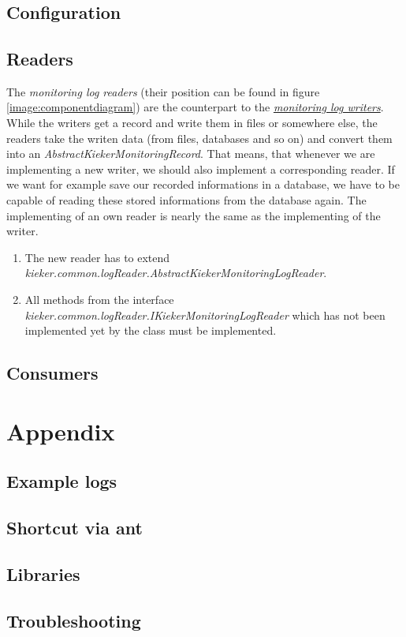 \documentclass[a4paper, oneside, 11pt]{scrartcl}
\begin{document}
\section{\KiekerAnalysis}
\subsection{Configuration}
\subsection{Readers}
The \textit{monitoring log readers} (their position can be found in figure \ref{image:componentdiagram}) are the counterpart to the \hyperlink{monitoringlogwriters}{\textit{monitoring log writers}}. While the writers get a record and write them in files or somewhere else, the readers take the writen data (from files, databases and so on) and convert them into an \textit{AbstractKiekerMonitoringRecord}. That means, that whenever we are implementing a new writer, we should also implement a corresponding reader. If we want for example save our recorded informations in a database, we have to be capable of reading these stored informations from the database again. The implementing of an own reader is nearly the same as the implementing of the writer.
\begin{enumerate}
 \item The new reader has to extend \textit{kieker.common.logReader.AbstractKiekerMonitoringLogReader}.
 \item All methods from the interface  \textit{kieker.common.logReader.IKiekerMonitoringLogReader} which has not been implemented yet by the class must be implemented.
\end{enumerate}

\subsection{Consumers}

\section{Appendix}
\subsection{Example logs}
\subsection{Shortcut via ant}
\subsection{Libraries}

\subsection{Troubleshooting}
\end{document}
